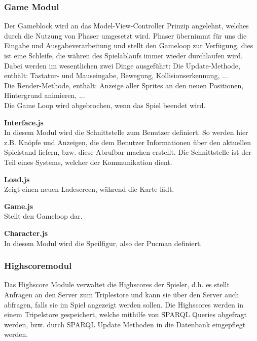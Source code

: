 \documentclass[11pt,a4paper]{article}
\begin{document}
\subsubsection{Game Modul}
Der Gameblock wird an das Model-View-Controller Prinzip angelehnt, welches durch die Nutzung von Phaser umgesetzt wird. 
Phaser übernimmt für uns die Eingabe und Ausgabeverarbeitung und stellt den Gameloop zur Verfügung, dies ist eine Schleife, die währen des Spielablaufs immer wieder durchlaufen wird.
Dabei werden im wesentlichen zwei Dinge ausgeführt:
Die Update-Methode, enthält: Tastatur- und Mauseingabe, Bewegung, Kollisionserkennung, ... \\
Die Render-Methode, enthält: Anzeige aller Sprites an den neuen Positionen, Hintergrund animieren, ... \\
Die Game Loop wird abgebrochen, wenn das Spiel beendet wird.
\par\bigskip
{\flushleft \textbf{Interface.js}} \\
In diesem Modul wird die Schnittstelle zum Benutzer definiert.
So werden hier z.B. Knöpfe und Anzeigen, die dem Benutzer Informationen über den aktuellen Spielstand liefern, bzw. diese Abrufbar machen erstellt.
Die Schnittstelle ist der Teil eines Systems, welcher der Kommunikation dient. \par\bigskip
{\flushleft \textbf{Load.js}} \\
Zeigt einen neuen Ladescreen, während die Karte lädt. \par\bigskip
{\flushleft \textbf{Game.js}} \\
Stellt den Gameloop dar. \par\bigskip
{\flushleft\textbf{Character.js}} \\
In diesem Modul wird die Speilfigur, also der Pucman definiert.

\subsubsection{Highscoremodul}
Das Highscore Module verwaltet die Highscores der Spieler, d.h. es stellt Anfragen an den Server zum Triplestore und kann sie über den Server auch abfragen, falls sie im Spiel angezeigt werden sollen.
Die Highscores werden in einem Tripelstore gespeichert, welche mithilfe von SPARQL Queries abgefragt werden, bzw. durch  SPARQL Update Methoden in die Datenbank eingepflegt werden.
\end{document}
